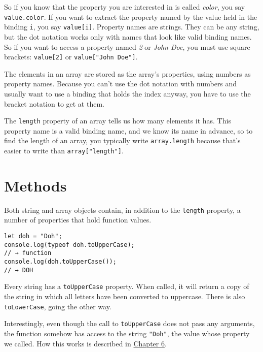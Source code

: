 So if you know that the property you are interested in is called \emph{color}, you say \lstinline`value.color`. If you want to extract the property named by the value held in the binding \lstinline`i`, you say \lstinline`value[i]`. Property names are strings. They can be any string, but the dot notation works only with names that look like valid binding names. So if you want to access a property named \emph{2} or \emph{John Doe}, you must use square brackets: \lstinline`value[2]` or \lstinline`value["John Doe"]`.

The elements in an array are stored as the array's properties, using numbers as property names. Because you can't use the dot notation with numbers and usually want to use a binding that holds the index anyway, you have to use the bracket notation to get at them.

The \lstinline`length` property of an array tells us how many elements it has. This property name is a valid binding name, and we know its name in advance, so to find the length of an array, you typically write \lstinline`array.length` because that's easier to write than \lstinline`array["length"]`.

\label{data.methods}\section{Methods}

Both string and array objects contain, in addition to the \lstinline`length` property, a number of properties that hold function values.

\begin{lstlisting}
let doh = "Doh";
console.log(typeof doh.toUpperCase);
// → function
console.log(doh.toUpperCase());
// → DOH
\end{lstlisting}
\noindent{}

Every string has a \lstinline`toUpperCase` property. When called, it will return a copy of the string in which all letters have been converted to uppercase. There is also \lstinline`toLowerCase`, going the other way.

Interestingly, even though the call to \lstinline`toUpperCase` does not pass any arguments, the function somehow has access to the string \lstinline`"Doh"`, the value whose property we called. How this works is described in \hyperref[object.obj_methods]{Chapter 6}.

